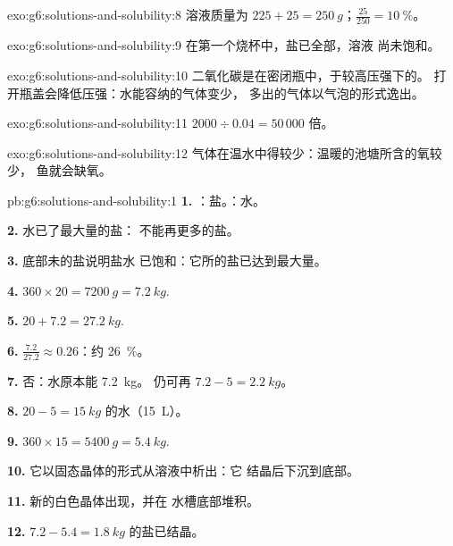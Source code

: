 \begin{solution}{exo:g6:solutions-and-solubility:8}
溶液质量为 $225 + 25 = \qty{250}{g}$；$\frac{25}{250} =
\qty{10}{\percent}$。
\end{solution}

\begin{solution}{exo:g6:solutions-and-solubility:9}
在第一个烧杯中，盐已全部，溶液
尚未饱和。
\end{solution}

\begin{solution}{exo:g6:solutions-and-solubility:10}
二氧化碳是在密闭瓶中，于较高压强下的。
打开瓶盖会降低压强：水能容纳的气体变少，
多出的气体以气泡的形式逸出。
\end{solution}

\begin{solution}{exo:g6:solutions-and-solubility:11}
$2000 \div 0.04 = 50\,000$ 倍。
\end{solution}

\begin{solution}{exo:g6:solutions-and-solubility:12}
气体在温水中得较少：温暖的池塘所含的氧较少，
鱼就会缺氧。
\end{solution}

\begin{solution}{pb:g6:solutions-and-solubility:1}
\textbf{1.} ：盐。：水。

\textbf{2.} 水已了最大量的盐：
不能再更多的盐。

\textbf{3.} 底部未的盐说明盐水
已饱和：它所的盐已达到最大量。

\textbf{4.} $360 \times 20 = \qty{7200}{g} = \qty{7.2}{kg}$.

\textbf{5.} $20 + 7.2 = \qty{27.2}{kg}$.

\textbf{6.} $\frac{7.2}{27.2} \approx 0.26$：约 \qty{26}{\percent}。

\textbf{7.} 否：水原本能 \qty{7.2}{kg}。
仍可再 $7.2 - 5 = \qty{2.2}{kg}$。

\textbf{8.} $20 - 5 = \qty{15}{kg}$ 的水（\qty{15}{L}）。

\textbf{9.} $360 \times 15 = \qty{5400}{g} = \qty{5.4}{kg}$.

\textbf{10.} 它以固态晶体的形式从溶液中析出：它
结晶后下沉到底部。

\textbf{11.} 新的白色晶体出现，并在
水槽底部堆积。

\textbf{12.} $7.2 - 5.4 = \qty{1.8}{kg}$ 的盐已结晶。
\end{solution}
